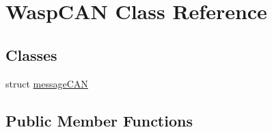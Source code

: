 \hypertarget{class_wasp_c_a_n}{}\section{Wasp\+C\+AN Class Reference}
\label{class_wasp_c_a_n}
\subsection*{Classes}
\begin{DoxyCompactItemize}
\item 
struct \hyperlink{struct_wasp_c_a_n_1_1message_c_a_n}{message\+C\+AN}
\end{DoxyCompactItemize}
\subsection*{Public Member Functions}

